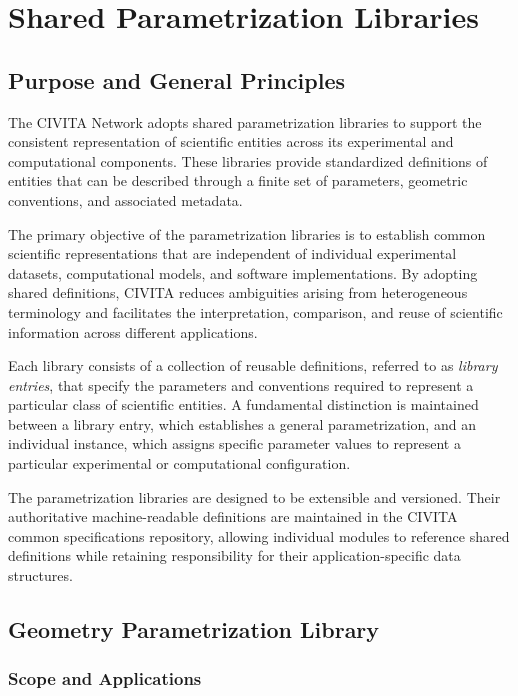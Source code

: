 \chapter{Shared Parametrization Libraries}

\section{Purpose and General Principles}

The CIVITA Network adopts shared parametrization libraries to support the consistent representation of scientific entities across its experimental and computational components. These libraries provide standardized definitions of entities that can be described through a finite set of parameters, geometric conventions, and associated metadata.

The primary objective of the parametrization libraries is to establish common scientific representations that are independent of individual experimental datasets, computational models, and software implementations. By adopting shared definitions, CIVITA reduces ambiguities arising from heterogeneous terminology and facilitates the interpretation, comparison, and reuse of scientific information across different applications.

Each library consists of a collection of reusable definitions, referred to as \emph{library entries}, that specify the parameters and conventions required to represent a particular class of scientific entities. A fundamental distinction is maintained between a library entry, which establishes a general parametrization, and an individual instance, which assigns specific parameter values to represent a particular experimental or computational configuration.

The parametrization libraries are designed to be extensible and versioned. Their authoritative machine-readable definitions are maintained in the CIVITA common specifications repository, allowing individual modules to reference shared definitions while retaining responsibility for their application-specific data structures.

\section{Geometry Parametrization Library}

\subsection{Scope and Applications}

